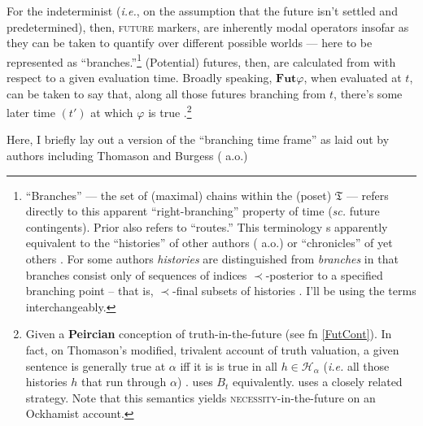 \documentclass[11pt,dvipsnames]{report}
\begin{document}
For the indeterminist (\textit{i.e.}, on the assumption that the future isn't settled and predetermined), then, \textsc{future} markers, are inherently modal operators insofar as they can be taken to quantify over different possible worlds --- here to be represented as ``branches.''\footnote{``Branches'' --- the set of (maximal) chains within the (poset) $\mathfrak T$ --- refers directly to this apparent ``right-branching'' property of time (\textit{sc.} future contingents). Prior also refers to ``routes.'' This terminology s apparently equivalent to the ``histories'' of other authors (\citealp{Thomason1970,Dowty1977,Tedeschi1981,Belnap2001a} a.o.) or ``chronicles'' of yet others \citep{Øhrstrøm1995}. For some authors \textit{histories} are distinguished from \textit{branches} in that branches consist only of sequences of indices $ \prec $-posterior to a specified branching point -- that is, $ \prec $-final subsets of histories \citep[\textit{e.g.},][4]{Zanardo1996}. I'll be using the terms interchangeably.} (Potential) futures, then, are calculated from with respect to a given evaluation time. Broadly speaking, $ \mathbf{Fut} \varphi $, when evaluated at $ t $, can be taken to say that, along all those futures branching from $ t $, there's some later time $ (t') $ at which $ \varphi $ is true \citep[see][267]{Thomason1970}.\footnote{Given a \textbf{Peircian} conception of truth-in-the-future (see fn \ref{FutCont}). In fact, on Thomason's modified, trivalent account of truth valuation, a given sentence is generally true at $ \alpha $ iff it is is true in all $ h\in\mathcal H_\alpha $ (\textit{i.e.} all those histories $ h $ that run through $ \alpha $) \citeyearpar[274\textit{ff}]{Thomason1970}. \citet{Thomason1984} uses $\mathit B_t $ equivalently. \citet[247]{Tedeschi1981} uses a closely related strategy. Note that this semantics yields \textsc{necessity}-in-the-future on an Ockhamist account.} 

Here, I briefly lay out a version of the ``branching time frame'' as laid out by authors including Thomason \citeyearpar[\textit{e.g.},][\S 5]{Thomason1984} and Burgess (\citeyear[\textit{e.g.},][]{Burgess1978} a.o.) 


\end{document}
